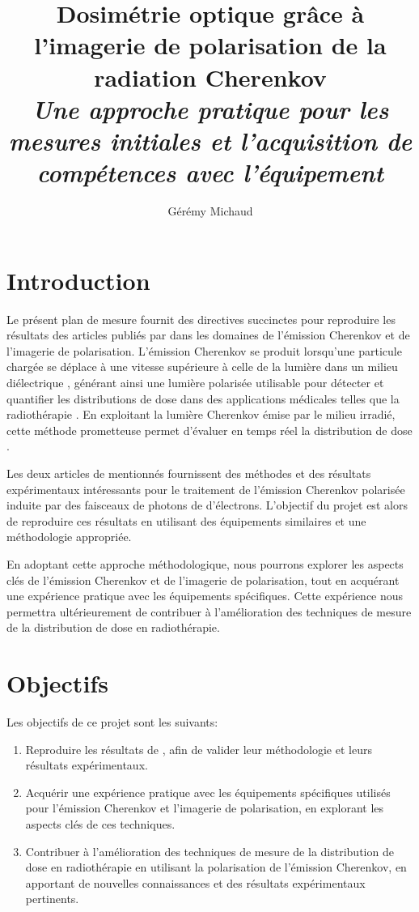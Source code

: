 \documentclass{Thesis}
\title{Dosimétrie optique grâce à l'imagerie de polarisation de la radiation Cherenkov
\\\Large{\textit{Une approche pratique pour les mesures initiales et l'acquisition de compétences avec l'équipement}}}
\author{Gérémy Michaud}{G. Michaud}
\begin{document}
\section*{Introduction}
Le présent plan de mesure fournit des directives succinctes pour reproduire les
résultats des articles publiés par  \cite{cloutierAccurateDoseMeasurements2022, cloutierDirectInwaterRadiation2022}
dans les domaines de l'émission Cherenkov et de l'imagerie de polarisation.
L'émission Cherenkov se produit lorsqu'une particule chargée se déplace à une vitesse supérieure à celle de la lumière
dans un milieu diélectrique \cite{cerenkovVisibleRadiationProduced1937},
générant ainsi une lumière polarisée utilisable pour détecter et quantifier les distributions de dose dans des applications médicales telles que la radiothérapie \cite{ashrafDosimetryFLASHRadiotherapy2020}.
En exploitant la lumière Cherenkov émise par le milieu irradié, cette méthode prometteuse permet d'évaluer en temps réel la distribution de dose \cite{jarvisCherenkovVideoImaging2014}.

Les deux articles de  mentionnés fournissent des méthodes et des résultats expérimentaux
intéressants pour le traitement de l'émission Cherenkov polarisée induite par des faisceaux de photons de d'électrons.
L'objectif du projet est alors de reproduire ces résultats en utilisant des équipements similaires et une méthodologie appropriée.

En adoptant cette approche méthodologique, nous pourrons explorer les aspects clés de
l'émission Cherenkov et de l'imagerie de polarisation, tout en acquérant une expérience
pratique avec les équipements spécifiques. Cette expérience nous permettra ultérieurement de contribuer
à l'amélioration des techniques de mesure de la distribution de dose en radiothérapie.

\section*{Objectifs}
Les objectifs de ce projet sont les suivants:
\begin{enumerate}
    \setlength\itemsep{1mm}
    \item Reproduire les résultats de , afin de valider leur méthodologie et leurs résultats expérimentaux.
    \item Acquérir une expérience pratique avec les équipements spécifiques utilisés pour l'émission Cherenkov et l'imagerie de polarisation, en explorant les aspects clés de ces techniques.
    \item Contribuer à l'amélioration des techniques de mesure de la distribution de dose en radiothérapie en utilisant la polarisation de l'émission Cherenkov, en apportant de nouvelles connaissances et des résultats expérimentaux pertinents.
\end{enumerate}
\end{document}
